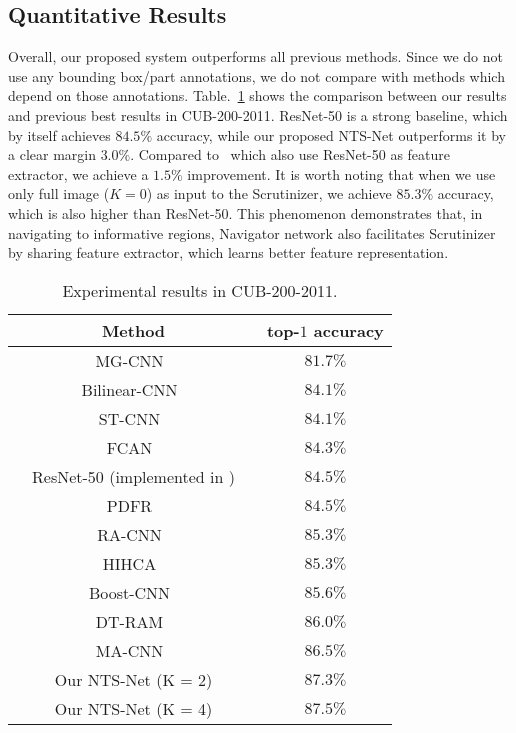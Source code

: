 \documentclass[runningheads]{llncs}
\begin{document}
\subsection{Quantitative Results}
Overall, our proposed system outperforms all previous methods. Since we do not use any bounding box/part annotations, we do not compare with methods which depend on those annotations. Table.~\ref{birds} shows the comparison between our results and previous best results in CUB-200-2011. ResNet-50 is a strong baseline, which by itself achieves $84.5\%$ accuracy, while our proposed NTS-Net outperforms it by a clear margin $3.0\%$. Compared to~\cite{Li_2017_ICCV_Workshops} which also use ResNet-50 as feature extractor, we achieve a $1.5\%$ improvement. It is worth noting that when we use only full image ($K=0$) as input to the Scrutinizer, we achieve $85.3\%$ accuracy, which is also higher than ResNet-50. This phenomenon demonstrates that, in navigating to informative regions, Navigator network also facilitates Scrutinizer by sharing feature extractor, which learns better feature representation.
\begin{table}[ht]
	\begin{center}
	\begin{tabular}{|c|c|}
	\hline
	Method & top-$1$ accuracy \\
	\hline\hline
	MG-CNN~\cite{Wang2015Multiple} & $81.7\%$ \\
	\hline
	Bilinear-CNN~\cite{lin2015bilinear} & $84.1\%$ \\
	\hline
	ST-CNN~\cite{NIPS2015_5854} & $84.1\%$ \\
	\hline
	FCAN~\cite{FCAN} & $84.3\%$\\
	\hline
	~~ResNet-50 (implemented in \cite{Li_2017_ICCV_Workshops})~~ & $84.5\%$ \\
	\hline
	PDFR~\cite{Zhang_2016_CVPR} & $84.5\%$\\
	\hline
	RA-CNN~\cite{Fu_2017_CVPR} & $85.3\%$\\
	\hline
	HIHCA~\cite{Cai_2017_ICCV} & $85.3\%$\\
	\hline
	Boost-CNN~\cite{Moghimi2016Boosted} & $85.6\%$\\
	\hline
	DT-RAM~\cite{Li_2017_ICCV_Workshops} & $86.0\%$\\
	\hline
	MA-CNN~\cite{Zheng_2017_ICCV} & $86.5\%$\\
	\hline
	\hline
	Our NTS-Net (K = 2) & $87.3\%$\\
	\hline
	Our NTS-Net (K = 4) & $\mathbf{87.5\%}$\\
	\hline
	\end{tabular}
	\end{center}
\caption{Experimental results in CUB-200-2011.}
\label{birds}
\end{table}
\end{document}

